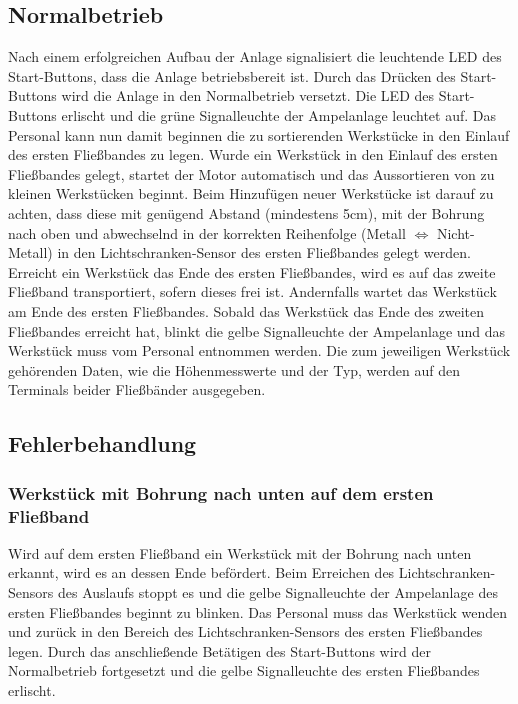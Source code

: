 \documentclass[oneside,a4paper,titlepage]{scrartcl} %
\begin{document}
\subsection{Normalbetrieb}
Nach einem erfolgreichen Aufbau der Anlage signalisiert die leuchtende LED des Start-Buttons, dass die Anlage betriebsbereit ist. Durch das Drücken des Start-Buttons wird die Anlage in den Normalbetrieb versetzt.\newline
\newline
Die LED des Start-Buttons erlischt und die grüne Signalleuchte der Ampelanlage leuchtet auf.\newline
\newline
Das Personal kann nun damit beginnen die zu sortierenden Werkstücke in den Einlauf des ersten Fließbandes zu legen.\newline
\newline
Wurde ein Werkstück in den Einlauf des ersten Fließbandes gelegt, startet der Motor automatisch und das Aussortieren von zu kleinen Werkstücken beginnt.\newline
Beim Hinzufügen neuer Werkstücke ist darauf zu achten, dass diese mit genügend Abstand (mindestens 5cm), mit der Bohrung nach oben und abwechselnd in der korrekten Reihenfolge (Metall $\Leftrightarrow$ Nicht-Metall) in den Lichtschranken-Sensor des ersten Fließbandes gelegt werden.\newline
\newline
Erreicht ein Werkstück das Ende des ersten Fließbandes, wird es auf das zweite Fließband transportiert, sofern dieses frei ist. Andernfalls wartet das Werkstück am Ende des ersten Fließbandes.\newline
\newline
Sobald das Werkstück das Ende des zweiten Fließbandes erreicht hat, blinkt die gelbe Signalleuchte der Ampelanlage und das Werkstück muss vom Personal entnommen werden.\newline
\newline
Die zum jeweiligen Werkstück gehörenden Daten, wie die Höhenmesswerte und der Typ, werden auf den Terminals beider Fließbänder ausgegeben.

\newpage

\subsection{Fehlerbehandlung}
\subsubsection{Werkstück mit Bohrung nach unten auf dem ersten Fließband}
Wird auf dem ersten Fließband ein Werkstück mit der Bohrung nach unten erkannt, wird es an dessen Ende befördert. Beim Erreichen des Lichtschranken-Sensors des Auslaufs stoppt es und die gelbe Signalleuchte der Ampelanlage des ersten Fließbandes beginnt zu blinken. Das Personal muss das Werkstück wenden und zurück in den Bereich des Lichtschranken-Sensors des ersten Fließbandes legen. Durch das anschließende Betätigen des Start-Buttons wird der Normalbetrieb fortgesetzt und die gelbe Signalleuchte des ersten Fließbandes erlischt.
\end{document}
